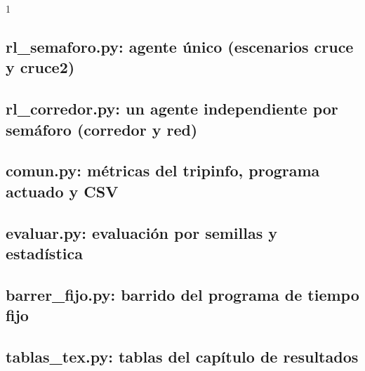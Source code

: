 \begin{spacing}{1}

\subsection*{rl\_semaforo.py: agente único (escenarios cruce y cruce2)}
{\scriptsize }

\subsection*{rl\_corredor.py: un agente independiente por semáforo (corredor y red)}
{\scriptsize }

\subsection*{comun.py: métricas del tripinfo, programa actuado y CSV}
{\scriptsize }

\subsection*{evaluar.py: evaluación por semillas y estadística}
{\scriptsize }

\subsection*{barrer\_fijo.py: barrido del programa de tiempo fijo}
{\scriptsize }

\subsection*{tablas\_tex.py: tablas del capítulo de resultados}
{\scriptsize }

\end{spacing}
